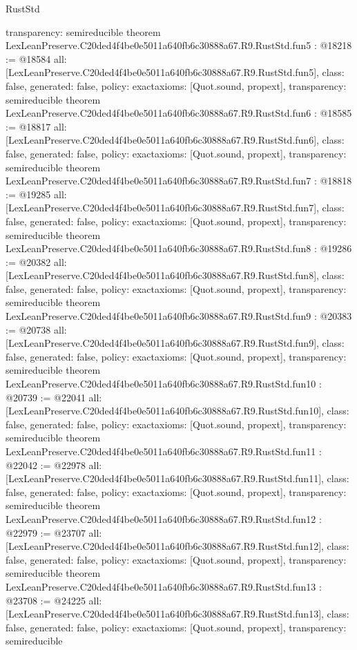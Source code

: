 \begin{lexlean}{RustStd}
\begin{coremodule}
{  transparency: semireducible
}
theorem LexLeanPreserve.C20ded4f4be0e5011a640fb6c30888a67.R9.RustStd.fun5 : @18218 := @18584 {
  all: [LexLeanPreserve.C20ded4f4be0e5011a640fb6c30888a67.R9.RustStd.fun5],
  class: false,
  generated: false,
  policy: exact{axioms: [Quot.sound, propext]},
  transparency: semireducible
}
theorem LexLeanPreserve.C20ded4f4be0e5011a640fb6c30888a67.R9.RustStd.fun6 : @18585 := @18817 {
  all: [LexLeanPreserve.C20ded4f4be0e5011a640fb6c30888a67.R9.RustStd.fun6],
  class: false,
  generated: false,
  policy: exact{axioms: [Quot.sound, propext]},
  transparency: semireducible
}
theorem LexLeanPreserve.C20ded4f4be0e5011a640fb6c30888a67.R9.RustStd.fun7 : @18818 := @19285 {
  all: [LexLeanPreserve.C20ded4f4be0e5011a640fb6c30888a67.R9.RustStd.fun7],
  class: false,
  generated: false,
  policy: exact{axioms: [Quot.sound, propext]},
  transparency: semireducible
}
theorem LexLeanPreserve.C20ded4f4be0e5011a640fb6c30888a67.R9.RustStd.fun8 : @19286 := @20382 {
  all: [LexLeanPreserve.C20ded4f4be0e5011a640fb6c30888a67.R9.RustStd.fun8],
  class: false,
  generated: false,
  policy: exact{axioms: [Quot.sound, propext]},
  transparency: semireducible
}
theorem LexLeanPreserve.C20ded4f4be0e5011a640fb6c30888a67.R9.RustStd.fun9 : @20383 := @20738 {
  all: [LexLeanPreserve.C20ded4f4be0e5011a640fb6c30888a67.R9.RustStd.fun9],
  class: false,
  generated: false,
  policy: exact{axioms: [Quot.sound, propext]},
  transparency: semireducible
}
theorem LexLeanPreserve.C20ded4f4be0e5011a640fb6c30888a67.R9.RustStd.fun10 : @20739 := @22041 {
  all: [LexLeanPreserve.C20ded4f4be0e5011a640fb6c30888a67.R9.RustStd.fun10],
  class: false,
  generated: false,
  policy: exact{axioms: [Quot.sound, propext]},
  transparency: semireducible
}
theorem LexLeanPreserve.C20ded4f4be0e5011a640fb6c30888a67.R9.RustStd.fun11 : @22042 := @22978 {
  all: [LexLeanPreserve.C20ded4f4be0e5011a640fb6c30888a67.R9.RustStd.fun11],
  class: false,
  generated: false,
  policy: exact{axioms: [Quot.sound, propext]},
  transparency: semireducible
}
theorem LexLeanPreserve.C20ded4f4be0e5011a640fb6c30888a67.R9.RustStd.fun12 : @22979 := @23707 {
  all: [LexLeanPreserve.C20ded4f4be0e5011a640fb6c30888a67.R9.RustStd.fun12],
  class: false,
  generated: false,
  policy: exact{axioms: [Quot.sound, propext]},
  transparency: semireducible
}
theorem LexLeanPreserve.C20ded4f4be0e5011a640fb6c30888a67.R9.RustStd.fun13 : @23708 := @24225 {
  all: [LexLeanPreserve.C20ded4f4be0e5011a640fb6c30888a67.R9.RustStd.fun13],
  class: false,
  generated: false,
  policy: exact{axioms: [Quot.sound, propext]},
  transparency: semireducible
}
\end{coremodule}
\end{lexlean}
